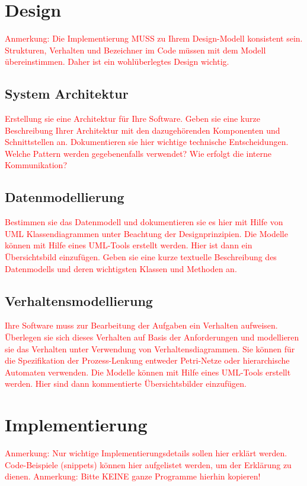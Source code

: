 \documentclass[a4paper, 11pt]{article}
\begin{document}
\section{Design}
\textcolor{red}{Anmerkung: Die Implementierung MUSS zu Ihrem Design-Modell konsistent sein. Strukturen, Verhalten und Bezeichner im Code müssen mit dem Modell übereinstimmen. Daher ist ein wohlüberlegtes Design wichtig.}

\subsection{System Architektur}
\textcolor{red}{Erstellung sie eine Architektur für Ihre Software. Geben sie eine kurze Beschreibung Ihrer Architektur mit den dazugehörenden Komponenten und Schnittstellen an. Dokumentieren sie hier wichtige technische Entscheidungen. Welche Pattern werden gegebenenfalls verwendet? Wie erfolgt die interne Kommunikation?}

\subsection{Datenmodellierung}
\textcolor{red}{Bestimmen sie das Datenmodell und dokumentieren sie es hier mit Hilfe von UML Klassendiagrammen unter Beachtung der Designprinzipien. Die Modelle können mit Hilfe eines UML-Tools erstellt werden. Hier ist dann ein Übersichtsbild einzufügen.
Geben sie eine kurze textuelle Beschreibung des Datenmodells und deren wichtigsten Klassen und Methoden an.
}

\subsection{Verhaltensmodellierung}
\textcolor{red}{Ihre Software muss zur Bearbeitung der Aufgaben ein Verhalten aufweisen. Überlegen sie sich dieses Verhalten auf Basis der Anforderungen und modellieren sie das Verhalten unter Verwendung von Verhaltensdiagrammen. Sie können für die Spezifikation der Prozess-Lenkung entweder Petri-Netze oder hierarchische Automaten verwenden. Die Modelle können mit Hilfe eines UML-Tools erstellt werden. Hier sind dann kommentierte Übersichtsbilder einzufügen.}

\section{Implementierung}
\textcolor{red}{Anmerkung: Nur wichtige Implementierungsdetails sollen hier erklärt werden. Code-Beispiele (snippets) können hier aufgelistet werden, um der Erklärung zu dienen. 
Anmerkung: Bitte KEINE ganze Programme hierhin kopieren!
}
\end{document}
